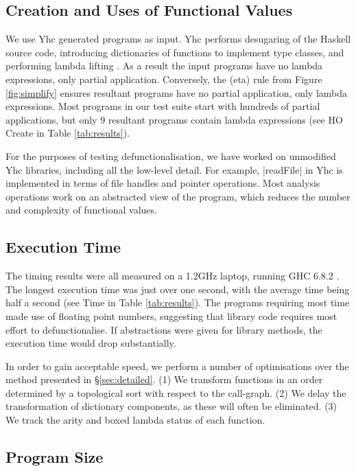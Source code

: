 \documentclass[preprint]{sigplanconf}
\begin{document}
\subsection{Creation and Uses of Functional Values}

We use Yhc generated programs as input. Yhc performs desugaring of the Haskell source code, introducing dictionaries of functions to implement type classes, and performing lambda lifting \cite{lambda_lift}. As a result the input programs have no lambda expressions, only partial application. Conversely, the (eta) rule from Figure \ref{fig:simplify} ensures resultant programs have no partial application, only lambda expressions. Most programs in our test suite start with hundreds of partial applications, but only 9 resultant programs contain lambda expressions (see HO Create in Table \ref{tab:results}).

For the purposes of testing defunctionalisation, we have worked on unmodified Yhc libraries, including all the low-level detail. For example, |readFile| in Yhc is implemented in terms of file handles and pointer operations. Most analysis operations work on an abstracted view of the program, which reduces the number and complexity of functional values.

\subsection{Execution Time}
\label{sec:time}

The timing results were all measured on a 1.2GHz laptop, running GHC 6.8.2 \cite{ghc}. The longest execution time was just over one second, with the average time being half a second (see Time in Table \ref{tab:results}). The programs requiring most time made use of floating point numbers, suggesting that library code requires most effort to defunctionalise. If abstractions were given for library methods, the execution time would drop substantially.

In order to gain acceptable speed, we perform a number of optimisations over the method presented in \S\ref{sec:detailed}. (1) We transform functions in an order determined by a topological sort with respect to the call-graph. (2) We delay the transformation of dictionary components, as these will often be eliminated. (3) We track the arity and boxed lambda status of each function.

\subsection{Program Size}
\end{document}
